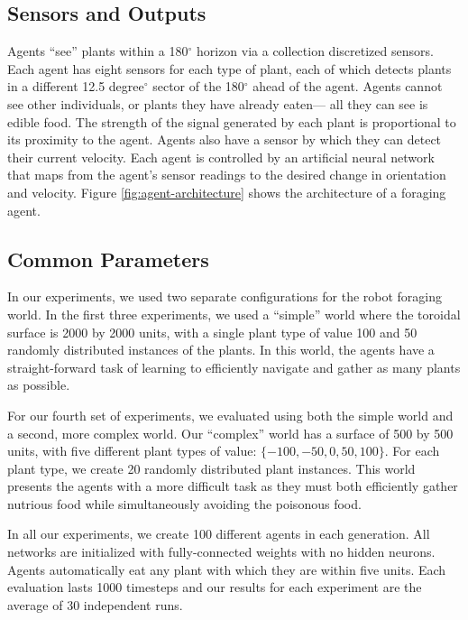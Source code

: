 \documentclass{acm_proc_article-sp}
\begin{document}
\subsection*{Sensors and Outputs}

Agents ``see'' plants within a 180$^\circ$ horizon via a collection discretized sensors. Each agent has eight sensors for each type of plant, each of which detects plants in a different 12.5 degree$^\circ$ sector of the 180$^\circ$ ahead of the agent. Agents cannot see other individuals, or plants they have already eaten--- all they can see is edible food. The strength of the signal generated by each plant is proportional to its proximity to the agent. Agents also have a sensor by which they can detect their current velocity. Each agent is controlled by an artificial neural network that maps from the agent's sensor readings to the desired change in orientation and velocity. Figure \ref{fig:agent-architecture} shows the architecture of a foraging agent.

\subsection*{Common Parameters}

In our experiments, we used two separate configurations for the robot foraging world. In the first three experiments, we used a ``simple'' world where the toroidal surface is 2000 by 2000 units, with a single plant type of value 100 and 50 randomly distributed instances of the plants. In this world, the agents have a straight-forward task of learning to efficiently navigate and gather as many plants as possible.

For our fourth set of experiments, we evaluated using both the simple world and a second, more complex world. Our ``complex'' world has a surface of 500 by 500 units, with five different plant types of value: $\{-100, -50, 0, 50, 100\}$. For each plant type, we create 20 randomly distributed plant instances. This world presents the agents with a more difficult task as they must both efficiently gather nutrious food while simultaneously avoiding the poisonous food.

In all our experiments, we create 100 different agents in each generation. All networks are initialized with fully-connected weights with no hidden neurons. Agents automatically eat any plant with which they are within five units. Each evaluation lasts 1000 timesteps and our results for each experiment are the average of 30 independent runs.
\end{document}
